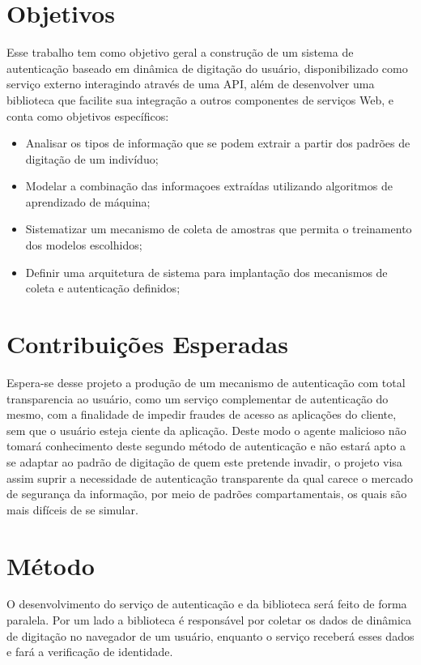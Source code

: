 \documentclass[pfc]{imetex}
\begin{document}
\section{Objetivos}
Esse trabalho tem como objetivo geral a construção de um sistema de autenticação baseado em dinâmica de digitação do usuário, disponibilizado como serviço externo interagindo através de uma API, além de desenvolver uma biblioteca que facilite sua integração a outros componentes de serviços Web, e conta como objetivos específicos: 

\begin{itemize}
\item Analisar os tipos de informação que se podem extrair a partir dos padrões de digitação de um indivíduo;
\item Modelar a combinação das informaçoes extraídas utilizando algoritmos de aprendizado de máquina;
\item Sistematizar um mecanismo de coleta de amostras que permita o treinamento dos modelos escolhidos;
\item Definir uma arquitetura de sistema para implantação dos mecanismos de coleta e autenticação definidos;
\end{itemize}

\section{Contribuições Esperadas}
Espera-se desse projeto a produção de um mecanismo de autenticação com total transparencia ao usuário, como um serviço complementar de autenticação do mesmo, com a finalidade de impedir fraudes de acesso as aplicações do cliente, sem que o usuário esteja ciente da aplicação. Deste modo o agente malicioso não tomará conhecimento deste segundo método de autenticação e não estará apto a se adaptar ao padrão de digitação de quem este pretende invadir, o projeto visa assim suprir a necessidade de autenticação transparente da qual carece o mercado de segurança da informação, por meio de padrões compartamentais, os quais são mais difíceis de se simular.  

\section{Método}
O desenvolvimento do serviço de autenticação e da biblioteca será feito de forma paralela. Por um lado a biblioteca é responsável por coletar os dados de dinâmica de digitação no navegador de um usuário, enquanto o serviço receberá esses dados e fará a verificação de identidade.
\end{document}
